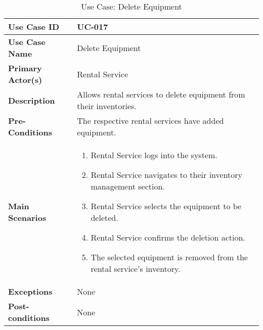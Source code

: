 \begin{table}[ht]
    \centering
    \begin{tabular}{|l|p{}|}
        \hline
        \textbf{Use Case ID} & UC-017 \\
        \hline
        \textbf{Use Case Name} & Delete Equipment \\
        \hline
        \textbf{Primary Actor(s)} & Rental Service \\
        \hline
        \textbf{Description} & Allows rental services to delete equipment from their inventories. \\
        \hline
        \textbf{Pre-Conditions} & The respective rental services have added equipment. \\
        \hline
        \textbf{Main Scenarios} & 
        \begin{enumerate}[label=\arabic*.,itemsep=0pt]
            \item Rental Service logs into the system.
            \item Rental Service navigates to their inventory management section.
            \item Rental Service selects the equipment to be deleted.
            \item Rental Service confirms the deletion action.
            \item The selected equipment is removed from the rental service's inventory.
        \end{enumerate} \\
        \hline
        \textbf{Exceptions} & None \\
        \hline
        \textbf{Post-conditions} & None \\
        \hline
    \end{tabular}
    \label{tab:use-case-delete-equipment}
    \caption{Use Case: Delete Equipment}
\end{table}


